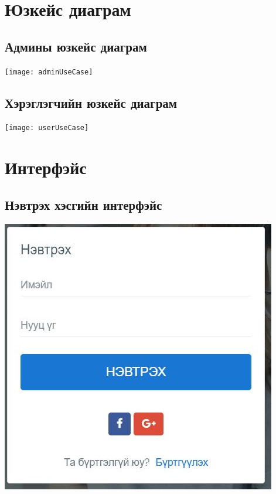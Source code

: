 \documentclass[
oneside, %
english, %
onehalfspacing, %
nolistspacing, %
headsepline, %
]{article} %
\begin{document}
	\section{Юзкейс диаграм}
	\subsection{Админы юзкейс диаграм}
     \texttt{[image: adminUseCase]}
	\subsection{Хэрэглэгчийн юзкейс диаграм}
     \texttt{[image: userUseCase]}
     
     	\section{Интерфэйс}
     	\subsection{Нэвтрэх хэсгийн интерфэйс}
     \includegraphics[width=\textwidth]{login}
\end{document}
